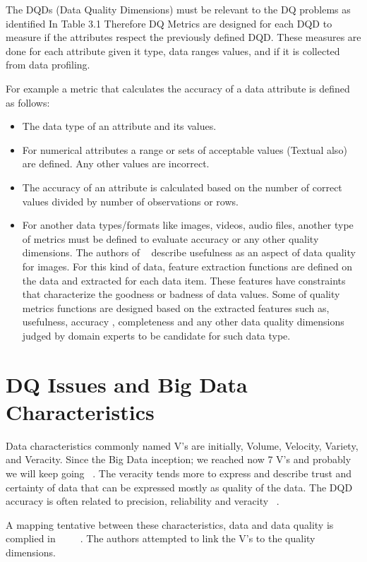 The DQDs (Data Quality Dimensions) must be relevant to the DQ problems as identified In Table 3.1 Therefore DQ Metrics are 
designed for each DQD to measure if the attributes respect the previously defined DQD. These measures
are done for each attribute given it type, data ranges values, and if it is collected from data profiling.

For example a metric that calculates the accuracy of a data attribute is defined as follows:

\begin{itemize}
  \item{
    The data type of an attribute and its values.}
  \item{
    For numerical attributes a range or sets of acceptable values (Textual also) are defined.
    Any other values are incorrect.
  }
  \item {
	The accuracy of an attribute is calculated based on the number of correct values divided by number of observations or rows.
  }
  \item{
	  For another data types/formats like images, videos, audio files, another type of metrics must be defined to evaluate
	  accuracy or any other quality dimensions. The authors of ~\cite{Firmani2015} describe usefulness as an aspect of data quality
	  for images. For this kind of data, feature extraction functions are defined on the data and extracted 
	  for each data item. These features have constraints that characterize the goodness or badness 
	  of data values. Some of quality metrics functions are designed based on the extracted features such as, usefulness, accuracy
	  , completeness and any other data quality dimensions judged by domain experts to be candidate for 
	  such data type. 
  }
\end{itemize}

\section{DQ Issues and Big Data Characteristics}

Data characteristics commonly named V's are initially, Volume, Velocity, Variety, and Veracity. Since the Big Data inception; 
we reached now 7 V's and probably we will keep going ~\cite{Gupta}. The veracity tends more to express and describe
trust and certainty of data that can be expressed mostly as quality of the data. 
The DQD accuracy is often related to precision, reliability and veracity ~\cite{Laboisse}.

A mapping tentative between these characteristics, data and data quality is complied in ~\citep{Caballero} ~\cite{Firmani2015} ~\cite{Zhu}.
The authors attempted to link the V's to the quality dimensions.

